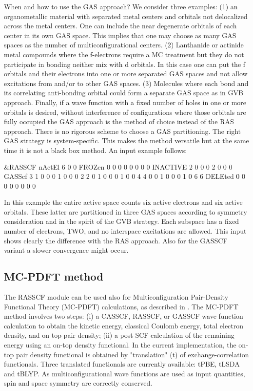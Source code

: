 When and how to use the GAS approach?
We consider three examples: (1) an organometallic material with separated metal
centers and orbitals not delocalized across the metal centers. One can include
the near degenerate orbitals of each center in its own GAS space.
This implies that one may choose as many GAS spaces as the number of
multiconfigurational centers. (2) Lanthanide or actinide metal compounds where
the f-electrons require a MC treatment but they do not participate in bonding
neither mix with d orbitals.  In this case one can put the f orbitals and their
electrons into one or more separated GAS spaces and not allow excitations
from and/or to other GAS spaces. (3) Molecules where each bond and its correlating
anti-bonding orbital could form a separate GAS space as in GVB approach.
Finally, if a wave function with a fixed number of holes in one or more
orbitals is desired, without interference of configurations where those
orbitals are fully occupied the GAS approach is the method of choice instead
of the RAS approach. There is no rigorous scheme to choose a GAS partitioning.
The right GAS strategy is system-specific. This makes the method versatile but
at the same time it is not a black box method.
An input example follows:
\begin{inputlisting}
&RASSCF
nActEl
 6 0 0
FROZen
0 0 0 0 0 0 0 0
INACTIVE
2 0 0 0 2 0 0 0
GASScf
3
 1 0 0 0 1 0 0 0
2 2
 0 1 0 0 0 1 0 0
4 4
 0 0 1 0 0 0 1 0
6 6
DELEted
0 0 0 0 0 0 0 0
\end{inputlisting}
In this example the entire active space counts six active electrons
and six active orbitals. These latter are partitioned in three GAS spaces
according to symmetry consideration and in the spirit of the GVB strategy.
Each subspace has a fixed number of electrons, TWO, and no interspace
excitations are allowed. This input shows clearly the difference
with the RAS approach.
Also for the GASSCF variant a slower convergence might occur.

\subsection{MC-PDFT method}
The RASSCF module can be used also for Multiconfiguration Pair-Density Functional Theory (MC-PDFT) calculations,
as described in \cite{limanni2014, limanni2015}. The MC-PDFT method involves two steps:
(i) a CASSCF, RASSCF, or GASSCF wave function calculation to obtain the kinetic energy, classical Coulomb energy,
total electron density, and on-top pair density; (ii) a post-SCF calculation of the remaining energy using an on-top density functional.
In the current implementation, the on-top pair density functional is obtained by "translation" (t) of exchange-correlation functionals.
Three translated functionals are currently available: tPBE, tLSDA and tBLYP.
As multiconfigurational wave functions are used as input quantities, spin and space symmetry are correctly conserved.

